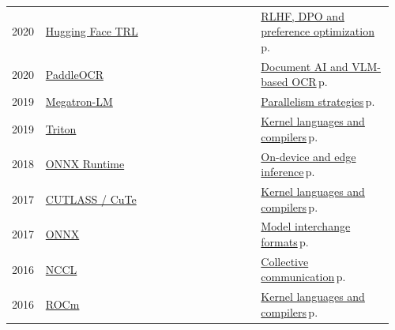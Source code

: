 \documentclass[10pt,a4paper,openany]{report}
\begin{document}
{\begin{longtable}{@{}p{0.07\linewidth}>{\raggedright}p{0.55\linewidth}>{\raggedright\arraybackslash}p{0.34\linewidth}@{}}
2020 & \href{https://github.com/huggingface/trl}{Hugging Face TRL} & \hyperref[c:reasoning-6]{RLHF, DPO and preference optimization}\,{\color{muted}\scriptsize p.\,\pageref{c:reasoning-6}}\\
2020 & \href{https://github.com/PaddlePaddle/PaddleOCR}{PaddleOCR} & \hyperref[c:vlm-4]{Document AI and VLM-based OCR}\,{\color{muted}\scriptsize p.\,\pageref{c:vlm-4}}\\
2019 & \href{https://github.com/NVIDIA/Megatron-LM}{Megatron-LM} & \hyperref[c:training-0]{Parallelism strategies}\,{\color{muted}\scriptsize p.\,\pageref{c:training-0}}\\
2019 & \href{https://github.com/triton-lang/triton}{Triton} & \hyperref[c:hardware-13]{Kernel languages and compilers}\,{\color{muted}\scriptsize p.\,\pageref{c:hardware-13}}\\
2018 & \href{https://github.com/microsoft/onnxruntime}{ONNX Runtime} & \hyperref[c:inference-6]{On-device and edge inference}\,{\color{muted}\scriptsize p.\,\pageref{c:inference-6}}\\
2017 & \href{https://github.com/NVIDIA/cutlass}{CUTLASS / CuTe} & \hyperref[c:hardware-13]{Kernel languages and compilers}\,{\color{muted}\scriptsize p.\,\pageref{c:hardware-13}}\\
2017 & \href{https://github.com/onnx/onnx}{ONNX} & \hyperref[c:hardware-15]{Model interchange formats}\,{\color{muted}\scriptsize p.\,\pageref{c:hardware-15}}\\
2016 & \href{https://github.com/NVIDIA/nccl}{NCCL} & \hyperref[c:hardware-14]{Collective communication}\,{\color{muted}\scriptsize p.\,\pageref{c:hardware-14}}\\
2016 & \href{https://github.com/ROCm/ROCm}{ROCm} & \hyperref[c:hardware-13]{Kernel languages and compilers}\,{\color{muted}\scriptsize p.\,\pageref{c:hardware-13}}\\
\end{longtable}}
\end{document}
